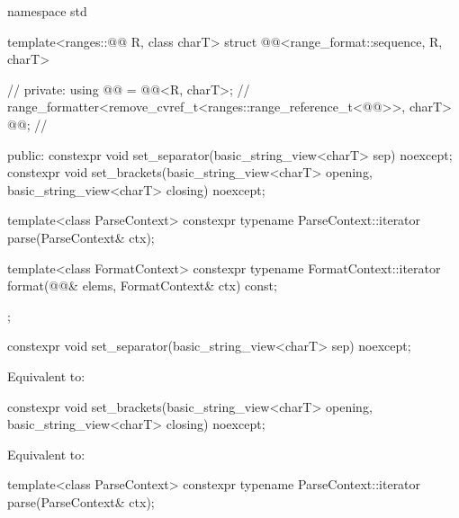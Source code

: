%
\begin{codeblock}
namespace std {
  template<ranges::@@ R, class charT>
  struct @@<range_format::sequence, R, charT> {    // \expos
  private:
    using @@ = @@<R, charT>;                    // \expos
    range_formatter<remove_cvref_t<ranges::range_reference_t<@@>>,
                    charT> @@;                                 // \expos

  public:
    constexpr void set_separator(basic_string_view<charT> sep) noexcept;
    constexpr void set_brackets(basic_string_view<charT> opening,
                                basic_string_view<charT> closing) noexcept;

    template<class ParseContext>
      constexpr typename ParseContext::iterator
        parse(ParseContext& ctx);

    template<class FormatContext>
      constexpr typename FormatContext::iterator
        format(@@& elems, FormatContext& ctx) const;
  };
}
\end{codeblock}

%
\begin{itemdecl}
constexpr void set_separator(basic_string_view<charT> sep) noexcept;
\end{itemdecl}

\begin{itemdescr}
\pnum
\effects
Equivalent to: 
\end{itemdescr}

%
\begin{itemdecl}
constexpr void set_brackets(basic_string_view<charT> opening,
                            basic_string_view<charT> closing) noexcept;
\end{itemdecl}

\begin{itemdescr}
\pnum
\effects
Equivalent to: 
\end{itemdescr}

%
\begin{itemdecl}
template<class ParseContext>
  constexpr typename ParseContext::iterator
    parse(ParseContext& ctx);
\end{itemdecl}


